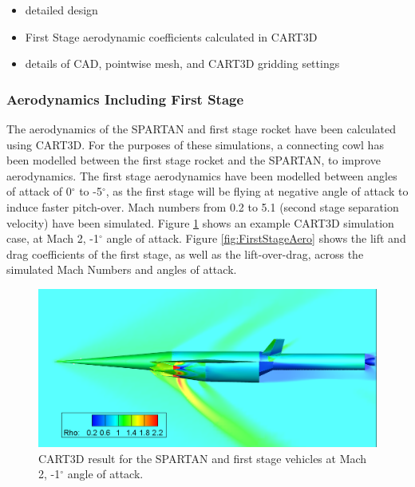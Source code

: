 \begin{itemize}
	\item detailed design
	\item First Stage aerodynamic coefficients calculated in CART3D
	\item details of CAD, pointwise mesh, and CART3D gridding settings
\end{itemize}


  \subsubsection{Aerodynamics Including First Stage}

  
  The aerodynamics of the SPARTAN and first stage rocket have been calculated using CART3D. For the purposes of these simulations, a connecting cowl has been modelled between the first stage rocket and the SPARTAN, to improve aerodynamics. The first stage aerodynamics have been modelled between angles of attack of 0$^\circ$ to -5$^\circ$, as the first stage will be flying at negative angle of attack to induce faster pitch-over. Mach numbers from 0.2 to 5.1 (second stage separation velocity) have been simulated. Figure \ref{fig:CARTcontour} shows an example CART3D simulation case, at Mach 2, -1$^\circ$ angle of attack. Figure \ref{fig:FirstStageAero} shows the lift and drag coefficients of the first stage, as well as the lift-over-drag, across the simulated Mach Numbers and angles of attack. 
  
  
  
  \begin{figure}
  	\centering
  	\includegraphics[width=0.7\linewidth]{figures/3_vehicle_design/CARTcontour}
  	\caption{CART3D result for the SPARTAN and first stage vehicles at Mach 2, -1$^\circ$ angle of attack.}
  	\label{fig:CARTcontour}
  \end{figure}

